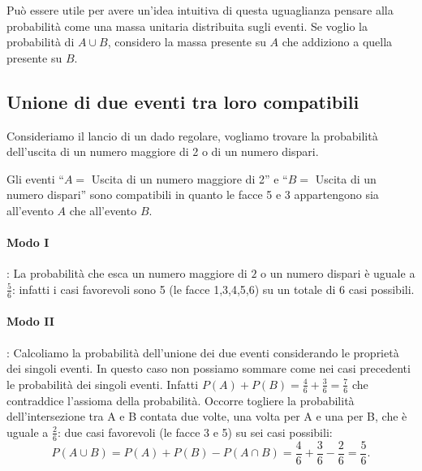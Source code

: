 Può essere utile per avere un'idea intuitiva di questa uguaglianza pensare 
alla 
probabilità come una massa unitaria distribuita sugli eventi. Se voglio la 
probabilità di \(A\cup B\), considero la massa presente su \(A\) che addiziono 
a 
quella presente su \(B\).

\subsection{Unione di due eventi tra loro compatibili}

\begin{esempio}
Consideriamo il lancio di un dado regolare, vogliamo trovare la probabilità 
dell'uscita di un numero maggiore di 2 o di un numero dispari.

Gli eventi ``\( A= \) Uscita di un numero maggiore di 2'' e ``\( B= \) Uscita 
di un 
numero dispari'' sono compatibili in quanto le facce 5 e 3 appartengono sia 
all'evento \(A\) che all'evento \(B\).
\begin{center}
 
\end{center}
\paragraph{Modo I}: La probabilità che esca un numero maggiore di \(2\) o un 
numero dispari è uguale a \(\frac 5 6\): infatti i casi favorevoli sono 5 (le 
facce 1,3,4,5,6) su un totale di \(6\) casi possibili.
\paragraph{Modo II}: Calcoliamo la probabilità dell'unione dei due eventi 
considerando le proprietà dei singoli eventi. In questo caso non possiamo 
sommare come nei casi precedenti le probabilità dei singoli eventi. Infatti 
\(P(A)+P(B)=\frac 4 6+\frac 3 6=\frac 7 6\) che contraddice l'assioma della 
probabilità. Occorre togliere la probabilità dell'intersezione tra A e B 
contata 
due volte, una volta per A e una per B, che è uguale a \(\frac 2 6\): due 
casi 
favorevoli (le facce 3 e 5) su sei casi possibili: \[P(A\cup 
B)=P(A)+P(B)-P(A\cap B)=\frac 4 6+\frac 3 6-\frac 2 6=\frac 5 6.\]
\end{esempio}

